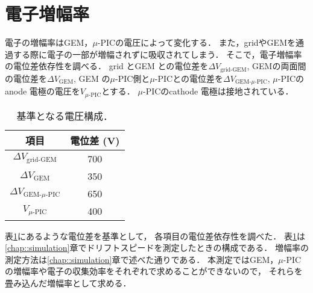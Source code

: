 \documentclass[../master]{subfiles}
\begin{document}
\section{電子増幅率}
電子の増幅率はGEM，$\mu$-PICの電圧によって変化する．
また，gridやGEMを通過する際に電子の一部が増幅されずに吸収されてしまう．
そこで，電子増幅率の電位差依存性を調べる．
grid とGEM との電位差を$\Delta V_{\text{grid-GEM}}$, GEMの両面間の電位差を$\Delta V_{\text{GEM}}$,
GEM の$\mu$-PIC側と$\mu$-PICとの電位差を$\Delta V_{\text{GEM-}\mu\text{-PIC}}$,
$\mu$-PICのanode 電極の電圧を$V_{\mu\text{-PIC}}$とする．
$\mu$-PICのcathode 電極は接地されている．
\begin{table}
  \centering
  \caption{基準となる電圧構成．}
  \label{tab::voltage_configuration}
%  
  \begin{tabular}{cc}
    \toprule
    項目 & 電位差 (\si{\volt}) \\
    \midrule
    $\Delta V_{\text{grid-GEM}}$ & 700 \\
    $\Delta V_{\text{GEM}}$ & 350 \\
    $\Delta V_{\text{GEM-}\mu\text{-PIC}}$ & 650 \\
    $V_{\mu\text{-PIC}}$ & 400 \\
    \bottomrule
  \end{tabular}
\end{table}
表\ref{tab::voltage_configuration}にあるような電位差を基準として，
各項目の電位差依存性を調べた．
表\ref{tab::voltage_configuration}は\ref{chap::simulation}章でドリフトスピードを測定したときの構成である．
増幅率の測定方法は\ref{chap::simulation}章で述べた通りである．
本測定ではGEM，$\mu$-PICの増幅率や電子の収集効率をそれぞれで求めることができないので，
それらを畳み込んだ増幅率として求める．

\end{document}
